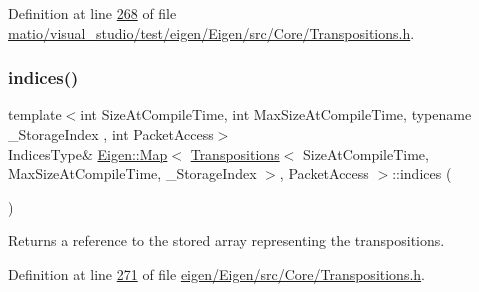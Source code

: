 Definition at line \hyperlink{matio_2visual__studio_2test_2eigen_2_eigen_2src_2_core_2_transpositions_8h_source_l00268}{268} of file \hyperlink{matio_2visual__studio_2test_2eigen_2_eigen_2src_2_core_2_transpositions_8h_source}{matio/visual\+\_\+studio/test/eigen/\+Eigen/src/\+Core/\+Transpositions.\+h}.

\mbox{\label{class_eigen_1_1_map_3_01_transpositions_3_01_size_at_compile_time_00_01_max_size_at_compile_timecc993082d7c0ba51ca94b27e97da8dd3_a1f8c96b93122a0e3237a05c11e8812c5}} 
\subsubsection{\texorpdfstring{indices()}{indices()}\hspace{0.1cm}{\footnotesize\ttfamily [3/4]}}
{\footnotesize\ttfamily template$<$int Size\+At\+Compile\+Time, int Max\+Size\+At\+Compile\+Time, typename \+\_\+\+Storage\+Index , int Packet\+Access$>$ \\
Indices\+Type\& \hyperlink{group___core___module_class_eigen_1_1_map}{Eigen\+::\+Map}$<$ \hyperlink{group___core___module_class_eigen_1_1_transpositions}{Transpositions}$<$ Size\+At\+Compile\+Time, Max\+Size\+At\+Compile\+Time, \+\_\+\+Storage\+Index $>$, Packet\+Access $>$\+::indices (\begin{DoxyParamCaption}{ }\end{DoxyParamCaption})\hspace{0.3cm}{\ttfamily [inline]}}

\begin{DoxyReturn}{Returns}
a reference to the stored array representing the transpositions. 
\end{DoxyReturn}


Definition at line \hyperlink{eigen_2_eigen_2src_2_core_2_transpositions_8h_source_l00271}{271} of file \hyperlink{eigen_2_eigen_2src_2_core_2_transpositions_8h_source}{eigen/\+Eigen/src/\+Core/\+Transpositions.\+h}.

